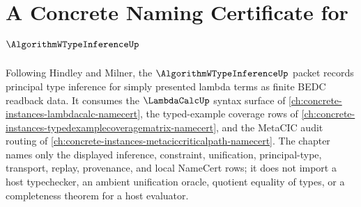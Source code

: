 \chapter{A Concrete Naming Certificate for $\AlgorithmWTypeInferenceUp$}
\label{ch:concrete-instances-algorithm-w-type-inference-namecert}

Following Hindley and Milner, the $\AlgorithmWTypeInferenceUp$ packet records principal type inference for simply presented lambda terms as finite BEDC readback data. It consumes the $\LambdaCalcUp$ syntax surface of \autoref{ch:concrete-instances-lambdacalc-namecert}, the typed-example coverage rows of \autoref{ch:concrete-instances-typedexamplecoveragematrix-namecert}, and the MetaCIC audit routing of \autoref{ch:concrete-instances-metaciccriticalpath-namecert}. The chapter names only the displayed inference, constraint, unification, principal-type, transport, replay, provenance, and local NameCert rows; it does not import a host typechecker, an ambient unification oracle, quotient equality of types, or a completeness theorem for a host evaluator.

